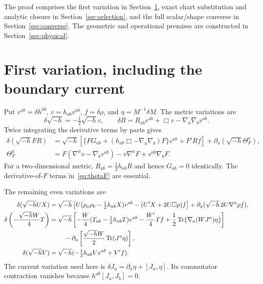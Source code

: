 \documentclass[11pt]{article}
\newcommand{\Tr}{\operatorname{Tr}}
\newcommand{\vol}{\sqrt{-h}}
\begin{document}
The proof comprises the first variation in Section~\ref{sec:variation}, exact chart substitution and analytic closure in Section~\ref{sec:selection}, and the full scalar/shape converse in Section~\ref{sec:converse}. The geometric and operational premises are constructed in Section~\ref{sec:physical}.

\section{First variation, including the boundary current}\label{sec:variation}

Put $v^{ab}=\delta h^{ab}$, $v=h_{ab}v^{ab}$, $f=\delta\rho$, and $\eta=M^{-1}\delta M$. The metric variations are
\begin{equation}
 \delta\vol=-\tfrac12\vol v,\qquad
 \delta R=R_{ab}v^{ab}+\Box v-\nabla_a\nabla_bv^{ab}.
\end{equation}
Twice integrating the derivative terms by parts gives
\begin{align}
 \delta(\vol FR)
 &=\vol\left[\{FG_{ab}+(h_{ab}\Box-\nabla_a\nabla_b)F\}v^{ab}+F'Rf\right]
 +\partial_a(\vol\Theta_F^a),\\
 \Theta_F^a&=F(\nabla^av-\nabla_bv^{ab})-v\nabla^aF+v^{ab}\nabla_bF.\label{eq:thetaF}
\end{align}
For a two-dimensional metric, $R_{ab}=\tfrac12h_{ab}R$ and hence $G_{ab}=0$ identically. The derivative-of-$F$ terms in~\eqref{eq:thetaF} are essential.

The remaining even variations are
\begin{align}
 \delta(\vol UX)&=\vol\left[U(\rho_a\rho_b-\tfrac12h_{ab}X)v^{ab}-(U'X+2U\Box\rho)f\right]
 +\partial_a(\vol\,2U\nabla^a\rho f),\\
 \delta\left(-\frac{\vol W}{4}T\right)
 &=\vol\left[-\frac W4(T_{ab}-\tfrac12h_{ab}T)v^{ab}-\frac{W'}4Tf
 +\frac12\Tr\{\nabla_a(WJ^a)\eta\}\right]\notag\\
 &\hspace{8mm}-\partial_a\left[\frac{\vol W}{2}\Tr(J^a\eta)\right],\\
 \delta(\vol V)&=\vol(-\tfrac12h_{ab}Vv^{ab}+V'f).
\end{align}
The current variation used here is $\delta J_a=\partial_a\eta+[J_a,\eta]$. Its commutator contraction vanishes because $h^{ab}[J_a,J_b]=0$.
\end{document}
